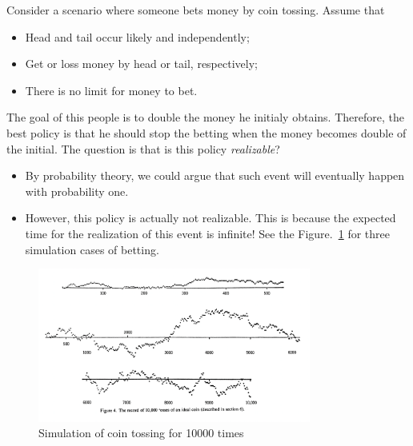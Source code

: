 \begin{example}
Consider a scenario where someone bets money by coin tossing.
Assume that
\begin{itemize}
\item
Head and tail occur likely and independently;
\item
Get or loss money by head or tail, respectively;
\item
There is no limit for money to bet.
\end{itemize}
The goal of this people is to double the money he initialy obtains.
Therefore, the best policy is that he should stop the betting 
when the money becomes double of the initial.
The question is that is this policy \emph{realizable}?
\begin{itemize}
\item
By probability theory, we could argue that such event will eventually happen with probability one.
\item
However, this policy is actually not realizable.
This is because the expected time for the realization of this event is infinite!
See the Figure.~\ref{fig:1:1} for three simulation cases of betting.
\end{itemize}
\begin{figure}[H]
\centering
\includegraphics[width=0.8\textwidth]{week1/p_1}
\caption{Simulation of coin tossing for 10000 times}
\label{fig:1:1}
\end{figure}
\end{example}

